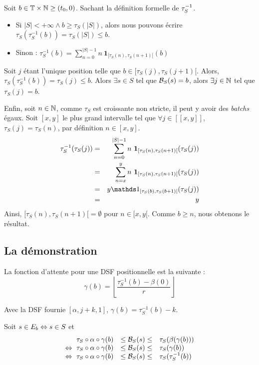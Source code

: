 Soit $b\in \mathbb{T}\times\mathbb{N}\geq (t_0,0)$. Sachant la définition formelle de $\tau^{-1}_S$. 
\begin{itemize}
\item Si $|S| < +\infty\wedge b \geq \tau_S(|S|)$, alors nous pouvons écrire $\tau_S(\tau_S^{-1}(b)) = \tau_S(|S|) \leq b$.
\item Sinon : $\tau_S^{-1}(b) =\sum_{n=0}^{|S|-1} n\ \mathbf 1_{[\tau_S(n), \tau_S(n+1)[}(b)$
\end{itemize}

Soit $j$ étant l'unique position telle que $b\in [\tau_S(j),\tau_S(j+1)[$. Alors, $\tau_S(\tau_S^{-1}(b)) = \tau_S(j) \leq b$. Alors $\exists s \in S$ tel que $\mathcal{B}_S(s) = b$, alors $\exists j\in \mathbb{N}$ tel que $\tau_S(j) = b$.

Enfin, soit $n\in \mathbb{N}$, comme $\tau_S$ est croissante non stricte, il peut y avoir des \textit{batchs} égaux. Soit $[x,y]$ le plus grand intervalle tel que $\forall j \in [\![x,y]\!]$, $\tau_S(j) = \tau_S(n)$, par définition $n\in [x,y]$.
\begin{eqnarray*}
\tau_S^{-1}(\tau_S(j)) &=& \sum_{n=0}^{|S|-1} n\ \mathbf 1_{[\tau_S(n), \tau_S(n+1)[}(\tau_S(j)) \\
& = &  \sum_{n=x}^{y} n\ \mathbf 1_{[\tau_S(n), \tau_S(n+1)[}(\tau_S(j)) \\
& = & y \indic_{[\tau_S(b), \tau_S(b+1)[}(\tau_S(j))\\
& = & y
\end{eqnarray*}
Ainsi, $[\tau_S(n), \tau_S(n+1)[ = \emptyset$ pour $n\in[x,y[$. Comme $b \geq n$, nous obtenons le résultat.

\subsection{La démonstration}
\def\rpos{\mathop{\mathrm{rpos}}}
La fonction d'attente pour une DSF positionnelle est la suivante : $$\gamma(b) = \left\lfloor \frac{\tau_S^{-1}(b) - \beta(0)}r\right\rfloor$$

Avec la DSF fournie $[\alpha,j+k,1]$, $\gamma(b) = \tau_S^{-1}(b)-k$. 

Soit $s\in E_{b}\Leftrightarrow s\in S$ et 
$$\begin{array}{rcl} 
\tau_S\circ\alpha\circ\gamma(b) & \leq \mathcal{B}_S(s) \leq & \tau_S(\beta(\gamma(b)))\\ 
\Leftrightarrow \ \tau_S\circ\alpha\circ\gamma(b) & \leq \mathcal{B}_S(s) \leq & \tau_S(\gamma(b))\\ 
\Leftrightarrow \ \tau_S\circ\alpha\circ\gamma(b) & \leq \mathcal{B}_S(s) \leq & \tau_S(\tau_S^{-1}(b))
 \end{array}$$

